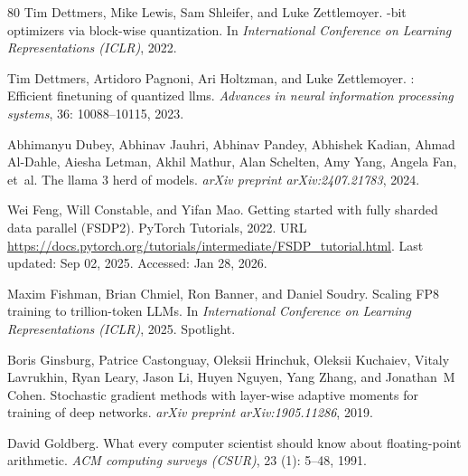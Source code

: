 \documentclass[10pt,twocolumn,letterpaper]{article}
\theoremstyle{plain}
\theoremstyle{definition}
\theoremstyle{remark}
\begin{document}
{\begin{thebibliography}{80}
Tim Dettmers, Mike Lewis, Sam Shleifer, and Luke Zettlemoyer.
-bit optimizers via block-wise quantization.
\newblock In \emph{International Conference on Learning Representations
  (ICLR)}, 2022.

Tim Dettmers, Artidoro Pagnoni, Ari Holtzman, and Luke Zettlemoyer.
: Efficient finetuning of quantized llms.
\newblock \emph{Advances in neural information processing systems},
  36: 10088--10115, 2023.

Abhimanyu Dubey, Abhinav Jauhri, Abhinav Pandey, Abhishek Kadian, Ahmad
  Al-Dahle, Aiesha Letman, Akhil Mathur, Alan Schelten, Amy Yang, Angela Fan,
  et~al.
\newblock The llama 3 herd of models.
\newblock \emph{arXiv preprint arXiv:2407.21783}, 2024.

Wei Feng, Will Constable, and Yifan Mao.
\newblock Getting started with fully sharded data parallel ({FSDP2}).
\newblock PyTorch Tutorials, 2022.
\newblock URL
  \url{https://docs.pytorch.org/tutorials/intermediate/FSDP_tutorial.html}.
\newblock Last updated: Sep 02, 2025. Accessed: Jan 28, 2026.

Maxim Fishman, Brian Chmiel, Ron Banner, and Daniel Soudry.
\newblock Scaling {FP8} training to trillion-token {LLM}s.
\newblock In \emph{International Conference on Learning Representations
  (ICLR)}, 2025.
\newblock Spotlight.

Boris Ginsburg, Patrice Castonguay, Oleksii Hrinchuk, Oleksii Kuchaiev, Vitaly
  Lavrukhin, Ryan Leary, Jason Li, Huyen Nguyen, Yang Zhang, and Jonathan~M
  Cohen.
\newblock Stochastic gradient methods with layer-wise adaptive moments for
  training of deep networks.
\newblock \emph{arXiv preprint arXiv:1905.11286}, 2019.

David Goldberg.
\newblock What every computer scientist should know about floating-point
  arithmetic.
\newblock \emph{ACM computing surveys (CSUR)}, 23 (1): 5--48,
  1991.


\end{thebibliography}}
\end{document}
